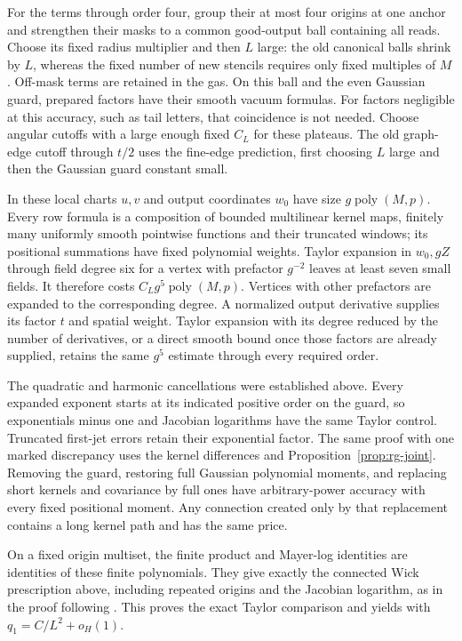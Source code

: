 For the terms through order four, group their at most four origins at
one anchor and strengthen their masks to a common good-output ball
containing all reads.  Choose its fixed radius multiplier and then
$L$ large: the old canonical balls shrink by $L$, whereas the fixed
number of new stencils requires only fixed multiples of $M$.
Off-mask terms are retained in the gas.  On this ball and the even
Gaussian guard, prepared factors have their smooth vacuum formulas.
For factors negligible at this accuracy, such as tail letters, that
coincidence is not needed.  Choose angular cutoffs with a large enough
fixed $C_L$ for these plateaus.  The old graph-edge cutoff through
$t/2$ uses the fine-edge prediction, first choosing $L$ large and then
the Gaussian guard constant small.

In these local charts $u,v$ and output coordinates $w_0$ have size
$g\operatorname{poly}(M,p)$.  Every row formula is a composition of
bounded multilinear kernel maps, finitely many uniformly smooth
pointwise functions and their truncated windows; its positional
summations have fixed polynomial weights.  Taylor expansion in
$w_0,gZ$ through field degree six for a vertex with prefactor $g^{-2}$
leaves at least seven small fields.  It therefore costs
$C_Lg^5\operatorname{poly}(M,p)$.  Vertices with other prefactors are
expanded to the corresponding degree.  A normalized output derivative
supplies its factor $t$ and spatial weight.  Taylor expansion with
its degree reduced by the number of derivatives, or a direct smooth
bound once those factors are already supplied, retains the same
$g^5$ estimate through every required order.

The quadratic and harmonic cancellations were established above.
Every expanded exponent starts at its indicated positive order on
the guard, so exponentials minus one and Jacobian logarithms have the
same Taylor control.  Truncated first-jet errors retain their
exponential factor.  The same proof with one marked discrepancy uses
the kernel differences and Proposition~\ref{prop:rg-joint}.  Removing
the guard, restoring full Gaussian polynomial moments, and replacing
short kernels and covariance by full ones have arbitrary-power
accuracy with every fixed positional moment.  Any connection created
only by that replacement contains a long kernel path and has the same
price.

On a fixed origin multiset, the finite product and Mayer-log
identities are identities of these finite polynomials.  They give
exactly the connected Wick prescription above, including repeated
origins and the Jacobian logarithm, as in the proof following
.  This proves the exact Taylor comparison
and yields  with
$q_1=C/L^2+o_H(1)$.

